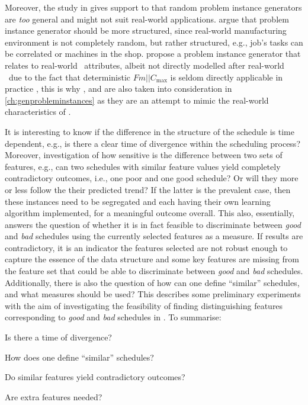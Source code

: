 Moreover, the study in \citet{InRu12} gives support to that random problem instance generators are \emph{too} general and might not suit real-world applications. \citet{Whitley} argue that problem instance generator should be more structured, since real-world manufacturing environment is not completely random, but rather structured, e.g.,  job's tasks can be correlated or machines in the shop. \citeauthor{Whitley} propose a problem instance generator that relates to real-world \fsp\ attributes, albeit not directly modelled after real-world \fsp\ due to the fact that deterministic $Fm||C_{\max}$ is seldom directly applicable in practice \citep{Dudek92}, this is why ,  and  are also taken into consideration in \cref{ch:genprobleminstances} as they are an attempt to mimic the real-world characteristics of \fsp.

It is interesting to know if the difference in the structure of the schedule is time dependent, e.g.,  is there a clear time of divergence within the scheduling process? 
Moreover, investigation of how sensitive is the difference between two sets of features, e.g.,  can two schedules with similar feature values yield completely contradictory outcomes, i.e., one poor and one good schedule? Or will they more or less follow the their predicted trend? If the latter is the prevalent case, then these instances need to be segregated and each having their own learning algorithm implemented, for a meaningful outcome overall.  
This also, essentially, answers the question of whether  it is in fact feasible to discriminate between \emph{good} and \emph{bad} schedules using the currently selected features as a measure. If results are contradictory, it is an indicator the features selected are not robust enough to capture the essence of the data structure and some key features are missing from the feature set that could be able to discriminate between \emph{good} and \emph{bad} schedules. 
Additionally, there is also the question of how can one define ``similar'' schedules, and what measures should be used? This  describes some preliminary experiments with the aim of investigating the feasibility of finding distinguishing features corresponding to \emph{good} and \emph{bad} schedules in \jsp. To summarise:
\begin{inparaenum}[(a)]
\item Is there a time of divergence?
\item How does one define ``similar'' schedules?
\item Do similar features yield contradictory outcomes?
\item Are extra features needed?
\end{inparaenum}

